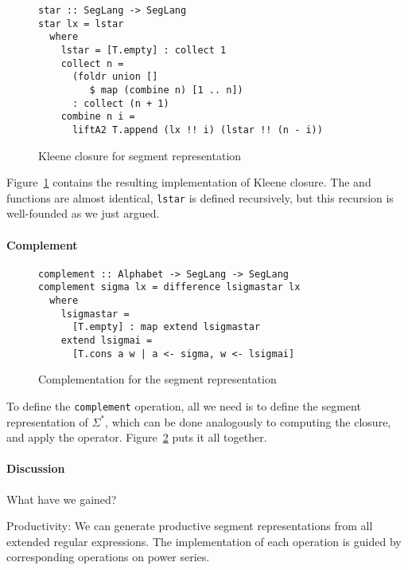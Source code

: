 \begin{figure}[tp]
\begin{lstlisting}
star :: SegLang -> SegLang
star lx = lstar
  where
    lstar = [T.empty] : collect 1
    collect n =
      (foldr union [] 
         $ map (combine n) [1 .. n])
      : collect (n + 1)
    combine n i =
      liftA2 T.append (lx !! i) (lstar !! (n - i))
\end{lstlisting}
\vspace{-\baselineskip}
  \caption{Kleene closure for segment representation}
  \label{fig:star-with-segments}
\end{figure}
Figure~\ref{fig:star-with-segments} contains the resulting implementation of Kleene closure.
The  and  functions are almost
identical, \lstinline{lstar} is defined recursively, but this recursion is well-founded as
we just argued. 

\paragraph{Complement}
\begin{figure}[tp]
\begin{lstlisting}
complement :: Alphabet -> SegLang -> SegLang
complement sigma lx = difference lsigmastar lx
  where
    lsigmastar =
      [T.empty] : map extend lsigmastar
    extend lsigmai =
      [T.cons a w | a <- sigma, w <- lsigmai]
\end{lstlisting}
\vspace{-\baselineskip}
  \caption{Complementation for the segment representation}
  \label{fig:llo-complement}
\end{figure}
To define the \lstinline{complement} operation, all we need is to define the segment
representation of $\Sigma^*$, which can be done analogously to computing the closure, and
apply the  operator. Figure~\ref{fig:llo-complement} puts it all together.

\paragraph{Discussion}\label{sec:motivation-discussion}
What have we gained?

Productivity: We can generate productive segment
representations from all extended regular expressions. The implementation of each
operation is guided by corresponding operations on power series.


